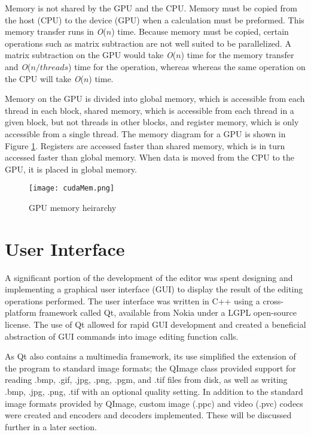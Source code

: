 \documentclass[10pt,twocolumn,twoside]{IEEEtran}
\renewcommand{\O}[1]{\textit{O}(\ensuremath{#1})}
\begin{document}
Memory is not shared by the GPU and the CPU. Memory must be copied from the host (CPU) to the device (GPU) when a calculation must be preformed. This memory transfer runs in \O{n} time. Because memory must be copied, certain operations such as matrix subtraction are not well suited to be parallelized. A matrix subtraction on the GPU would take \O{n} time for the memory transfer and \O{n/threads} time for the operation, whereas whereas the same operation on the CPU will take \O{n} time.

Memory on the GPU is divided into global memory, which is accessible from each thread in each block, shared memory, which is accessible from each thread in a given block, but not threads in other blocks, and register memory, which is only accessible from a single thread. The memory diagram for a GPU is shown in Figure \ref{fig:cudaMem}. Registers are accessed faster than shared memory, which is in turn accessed faster than global memory. When data is moved from the CPU to the GPU, it is placed in global memory.

\begin{figure}[h]
\begin{center}
\texttt{[image: cudaMem.png]}
\caption{GPU memory heirarchy}
\label{fig:cudaMem}
\end{center}
\end{figure}

\section{User Interface}
A significant portion of the development of the editor was spent designing and implementing a graphical user interface (GUI) to display the result of the editing operations performed. The user interface was written in C++ using a cross-platform framework called Qt, available from Nokia under a LGPL open-source license. The use of Qt allowed for rapid GUI development and created a beneficial abstraction of GUI commands into image editing function calls. 

As Qt also contains a multimedia framework, its use simplified the extension of the program to standard image formats; the QImage class provided support for reading .bmp, .gif, .jpg, .png, .pgm, and .tif files from disk, as well as writing .bmp, .jpg, .png, .tif with an optional quality setting. In addition to the standard image formats provided by QImage, custom image (.ppc) and video (.pvc) codecs were created and encoders and decoders implemented. These will be discussed further in a later section.
\end{document}
